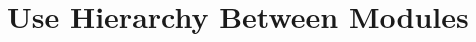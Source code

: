 \documentclass[12pt, titlepage]{article}
\newcommand{\mref}[1]{M\ref{#1}}
\begin{document}
%

\newpage

\section{Use Hierarchy Between Modules} \label{SecUse}
\end{document}
